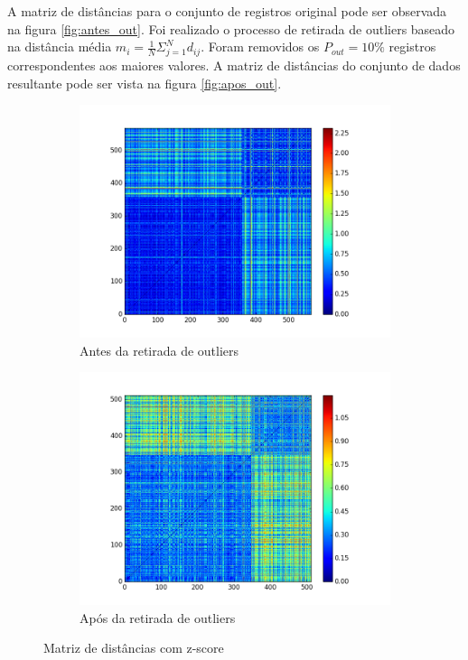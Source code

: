 \documentclass[11pt,a4paper]{article}
\numberwithin{equation}{section}
\begin{document}
A matriz de distâncias para o conjunto de registros original pode ser observada na figura \ref{fig:antes_out}. Foi realizado o processo de retirada de outliers baseado na distância média $m_i = \frac{1}{N} \Sigma^N_{j=1} d_{ij}$. Foram removidos os $P_{out} = 10\%$ registros correspondentes aos maiores valores. A matriz de distâncias do conjunto de dados resultante pode ser vista na figura \ref{fig:apos_out}.

\begin{figure}[H]
\centering
\begin{subfigure}{.5\textwidth}
  \centering
  \includegraphics[width=\linewidth]{../img/dist_zscore_out}
  \caption{Antes da retirada de outliers}
  \label{fig:zantes_out}
\end{subfigure}%
\begin{subfigure}{.5\textwidth}
  \centering
  \includegraphics[width=\linewidth]{../img/distance_zscore_clean}
  \caption{Após da retirada de outliers}
  \label{fig:zapos_out}
\end{subfigure}
\caption{Matriz de distâncias com z-score}
\label{fig:zscore}
\end{figure}
\end{document}
